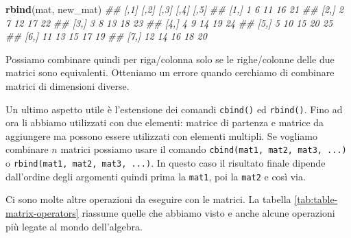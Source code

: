 \documentclass[
]{book}
\newenvironment{Shaded}{\begin{snugshade}}{\end{snugshade}}
\newcommand{\CommentTok}[1]{\textcolor[rgb]{0.56,0.35,0.01}{\textit{#1}}}
\newcommand{\KeywordTok}[1]{\textcolor[rgb]{0.13,0.29,0.53}{\textbf{#1}}}
\newcommand{\NormalTok}[1]{#1}
\begin{document}
\begin{Shaded}
\begin{Highlighting}[]
\KeywordTok{rbind}\NormalTok{(mat, new_mat)}
\CommentTok{##      [,1] [,2] [,3] [,4] [,5]}
\CommentTok{## [1,]    1    6   11   16   21}
\CommentTok{## [2,]    2    7   12   17   22}
\CommentTok{## [3,]    3    8   13   18   23}
\CommentTok{## [4,]    4    9   14   19   24}
\CommentTok{## [5,]    5   10   15   20   25}
\CommentTok{## [6,]   11   13   15   17   19}
\CommentTok{## [7,]   12   14   16   18   20}
\end{Highlighting}
\end{Shaded}

Possiamo combinare quindi per riga/colonna solo se le righe/colonne delle due matrici sono equivalenti. Otteniamo un errore quando cerchiamo di combinare matrici di dimensioni diverse.

Un ultimo aspetto utile è l'estensione dei comandi \texttt{cbind()} ed \texttt{rbind()}. Fino ad ora li abbiamo utilizzati con due elementi: matrice di partenza e matrice da aggiungere ma possono essere utilizzati con elementi multipli. Se vogliamo combinare \(n\) matrici possiamo usare il comando \texttt{cbind(mat1,\ mat2,\ mat3,\ ...)} o \texttt{rbind(mat1,\ mat2,\ mat3,\ ...)}. In questo caso il risultato finale dipende dall'ordine degli argomenti quindi prima la \texttt{mat1}, poi la \texttt{mat2} e così via.

Ci sono molte altre operazioni da eseguire con le matrici. La tabella \ref{tab:table-matrix-operators} riassume quelle che abbiamo visto e anche alcune operazioni più legate al mondo dell'algebra.
\end{document}
